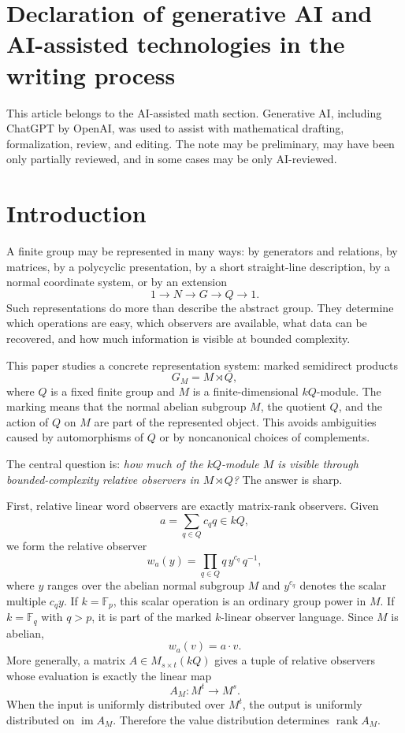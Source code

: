 \documentclass[11pt]{article}
\begin{document}
\section*{Declaration of generative AI and AI-assisted technologies in the writing process}
This article belongs to the AI-assisted math section. Generative AI, including ChatGPT by \mbox{OpenAI}, was used to assist with mathematical drafting, formalization, review, and editing. The note may be preliminary, may have been only partially reviewed, and in some cases may be only AI-reviewed.

\section{Introduction}

A finite group may be represented in many ways: by generators and relations, by matrices, by a polycyclic presentation, by a short straight-line description, by a normal coordinate system, or by an extension
\[
1\to N\to G\to Q\to 1.
\]
Such representations do more than describe the abstract group. They determine which operations are easy, which observers are available, what data can be recovered, and how much information is visible at bounded complexity.

This paper studies a concrete representation system: marked semidirect products
\[
G_M=M\rtimes Q,
\]
where $Q$ is a fixed finite group and $M$ is a finite-dimensional $kQ$-module. The marking means that the normal abelian subgroup $M$, the quotient $Q$, and the action of $Q$ on $M$ are part of the represented object. This avoids ambiguities caused by automorphisms of $Q$ or by noncanonical choices of complements.

The central question is: \emph{how much of the $kQ$-module $M$ is visible through bounded-complexity relative observers in $M\rtimes Q$?}
The answer is sharp.

First, relative linear word observers are exactly matrix-rank observers. Given
\[
a=\sum_{q\in Q} c_q q\in kQ,
\]
we form the relative observer
\[
w_a(y)=\prod_{q\in Q} q\, y^{c_q}\, q^{-1},
\]
where $y$ ranges over the abelian normal subgroup $M$ and $y^{c_q}$ denotes the scalar multiple $c_qy$. If $k=\mathbb F_p$, this scalar operation is an ordinary group power in $M$. If $k=\mathbb F_q$ with $q>p$, it is part of the marked $k$-linear observer language. Since $M$ is abelian,
\[
w_a(v)=a\cdot v.
\]
More generally, a matrix $A\in M_{s\times t}(kQ)$ gives a tuple of relative observers whose evaluation is exactly the linear map
\[
A_M:M^t\to M^s.
\]
When the input is uniformly distributed over $M^t$, the output is uniformly distributed on $\operatorname{im}A_M$. Therefore the value distribution determines $\operatorname{rank}A_M$.
\end{document}
